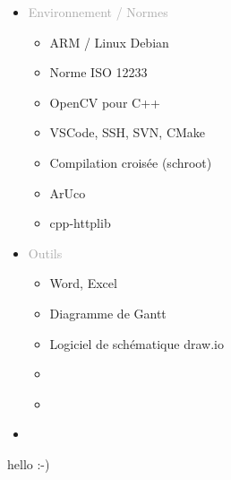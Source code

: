 \documentclass{article}
\begin{document}
\begin{tabular}
\begin{itemize}[label={}, topsep=10pt, partopsep=0pt, itemsep=0.5pt, parsep=2pt]
\begin{itemize}
            \item[\textcolor{white}{\checkmark}] \textcolor{gray!80}{} %
            \item[\textcolor{white}{\checkmark}] \textcolor{gray!80}{} %
        \end{itemize}
        \item \textcolor{darkGray}{Environnement / Normes} 
        \begin{itemize}
        [label={\textcolor{gray!80}{\checkmark}}, topsep=10pt, partopsep=0pt, itemsep=0.5pt, parsep=2pt] 
            \item \textcolor{gray!80}{ARM / Linux Debian}
            \item \textcolor{gray!80}{Norme ISO 12233}
            \item \textcolor{gray!80}{OpenCV pour C++}
            \item \textcolor{gray!80}{VSCode, SSH, SVN, CMake}
            \item \textcolor{gray!80}{Compilation croisée (schroot)}
            \item \textcolor{gray!80}{ArUco}
            \item \textcolor{gray!80}{cpp-httplib} 
        \end{itemize}
        \item \textcolor{darkGray}{Outils}
        \begin{itemize}
        [label={\textcolor{gray!80}{\checkmark}}, topsep=10pt, partopsep=0pt, itemsep=0.5pt, parsep=2pt] 
            \item \textcolor{gray!80}{Word, Excel}
            \item \textcolor{gray!80}{Diagramme de Gantt}
            \item \textcolor{gray!80}{Logiciel de schématique draw.io}
            \item[\textcolor{white}{\checkmark}] \textcolor{gray!80}{} %
            \item[\textcolor{white}{\checkmark}] \textcolor{gray!80}{} %
        \end{itemize}
        \item \textcolor{darkGray}{}
    \end{itemize}
\end{tabular}

\vfill %


\newpage
\thispagestyle{pro_experience_linxens}

hello :-)
\end{document}

